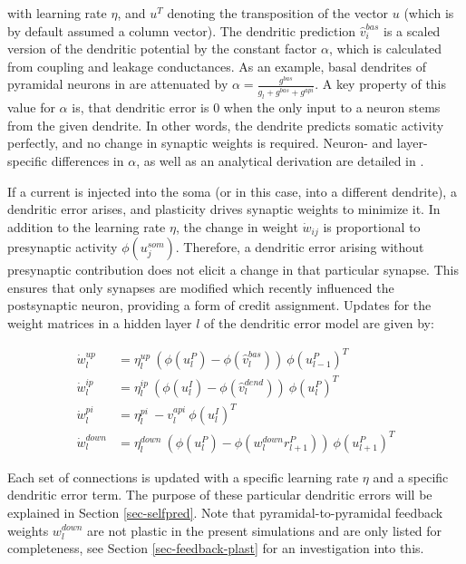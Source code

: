 with learning rate $\eta$, and $u^T$ denoting the transposition of the vector $u$ (which is by default assumed a column
vector). The dendritic prediction $\hat{v}_i^{bas}$ is a scaled version of the dendritic potential by the constant
factor $\alpha$, which is calculated from coupling and leakage conductances. As an example, basal dendrites of pyramidal
neurons in \citep{sacramento2018dendritic} are attenuated by $\alpha = \frac{g^{bas}}{g_l + g^{bas} + g^{api}}$. A key
property of this value for $\alpha$ is, that dendritic error is $0$ when the only input to a neuron stems from the given
dendrite. In other words, the dendrite predicts somatic activity perfectly, and no change in synaptic weights is
required. Neuron- and layer-specific differences in $\alpha$, as well as an analytical derivation are detailed in
\citep{sacramento2018dendritic}.

If a current is injected into the soma (or in this case, into a different dendrite), a dendritic error arises, and
plasticity drives synaptic weights to minimize it. In addition to the learning rate $\eta$, the change in weight
$\dot{w}_{ij}$ is proportional to presynaptic activity $\phi(u_j^{som})$. Therefore, a dendritic error arising without
presynaptic contribution does not elicit a change in that particular synapse. This ensures that only synapses are
modified which recently influenced the postsynaptic neuron, providing a form of credit assignment. Updates for the
weight matrices in a hidden layer $l$ of the dendritic error model are given by:

\begin{align}
  \dot{w}_{l}^{up}   & = \eta_l^{up} \ ( \phi(u_l^{P}) - \phi(\hat{v}_l^{bas}) ) \ \phi(u_{l-1}^{P})^T\label{eq-delta_w_up}         \\
  \dot{w}_{l}^{ip}   & = \eta_l^{ip} \ ( \phi(u_l^{I}) - \phi(\hat{v}_l^{dend}) ) \ \phi(u_{l}^{P})^T\label{eq-delta_w_ip}          \\
  \dot{w}_{l}^{pi}   & = \eta_l^{pi} \ - v_l^{api} \ \phi(u_l^{I})^T\label{eq-delta_w_pi}                                           \\
  \dot{w}_{l}^{down} & = \eta_l^{down} \ ( \phi(u_l^{P}) - \phi(w_l^{down} r_{l+1}^P) )\ \phi(u_{l+1}^{P})^T\label{eq-delta_w_down}
\end{align}

Each set of connections is updated with a specific learning rate $\eta$ and a specific dendritic error term. The purpose
of these particular dendritic errors will be explained in Section \ref{sec-selfpred}. Note that pyramidal-to-pyramidal
feedback weights $w_l^{down}$ are not plastic in the present simulations and are only listed for completeness, see
Section \ref{sec-feedback-plast} for an investigation into this.

